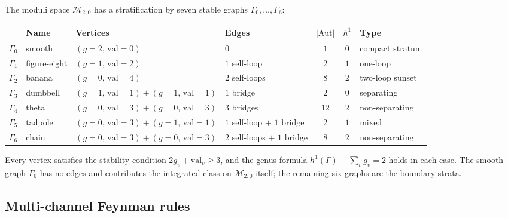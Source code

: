 \documentclass[11pt]{article}
\theoremstyle{plain}
\theoremstyle{definition}
\theoremstyle{remark}
\begin{document}
The moduli space $\overline{\mathcal{M}}_{2,0}$ has a
stratification by seven stable graphs $\Gamma_0, \ldots, \Gamma_6$:

\begin{center}
\small
\renewcommand{\arraystretch}{1.3}
\begin{tabular}{clllccl}
& \textbf{Name}
& \textbf{Vertices}
& \textbf{Edges}
& $|\mathrm{Aut}|$
& $h^1$
& \textbf{Type} \\
\hline
$\Gamma_0$ & smooth
 & $(g{=}2,\, \mathrm{val}{=}0)$
 & $0$
 & $1$ & $0$ & compact stratum \\[2pt]
$\Gamma_1$ & figure-eight
 & $(g{=}1,\, \mathrm{val}{=}2)$
 & $1$ self-loop
 & $2$ & $1$ & one-loop \\[2pt]
$\Gamma_2$ & banana
 & $(g{=}0,\, \mathrm{val}{=}4)$
 & $2$ self-loops
 & $8$ & $2$ & two-loop sunset \\[2pt]
$\Gamma_3$ & dumbbell
 & $(g{=}1,\, \mathrm{val}{=}1) + (g{=}1,\, \mathrm{val}{=}1)$
 & $1$ bridge
 & $2$ & $0$ & separating \\[2pt]
$\Gamma_4$ & theta
 & $(g{=}0,\, \mathrm{val}{=}3) + (g{=}0,\, \mathrm{val}{=}3)$
 & $3$ bridges
 & $12$ & $2$ & non-separating \\[2pt]
$\Gamma_5$ & tadpole
 & $(g{=}0,\, \mathrm{val}{=}3) + (g{=}1,\, \mathrm{val}{=}1)$
 & $1$ self-loop $+$ $1$ bridge
 & $2$ & $1$ & mixed \\[2pt]
$\Gamma_6$ & chain
 & $(g{=}0,\, \mathrm{val}{=}3) + (g{=}0,\, \mathrm{val}{=}3)$
 & $2$ self-loops $+$ $1$ bridge
 & $8$ & $2$ & non-separating
\end{tabular}
\end{center}
Every vertex satisfies the stability condition $2g_v + \mathrm{val}_v
\geq 3$, and the genus formula $h^1(\Gamma) + \sum_v g_v = 2$ holds
in each case. The smooth graph $\Gamma_0$ has no edges and contributes
the integrated class on $\mathcal{M}_{2,0}$ itself; the remaining six
graphs are the boundary strata.


\subsection{Multi-channel Feynman rules}
\label{subsec:w3-feynman-rules}
\end{document}
